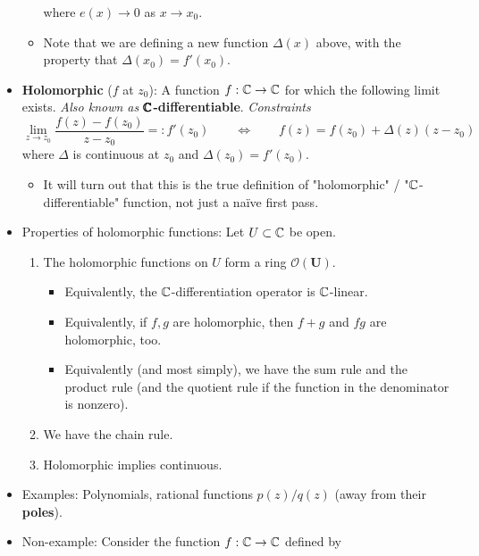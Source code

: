 \documentclass[../notes.tex]{subfiles}
\begin{document}
\begin{itemize}
\begin{itemize}
\begin{equation*}
        \end{equation*}
        where $e(x)\to 0$ as $x\to x_0$.
        \item Note that we are defining a new function $\Delta(x)$ above, with the property that $\Delta(x_0)=f'(x_0)$.
    \end{itemize}
    \pagebreak
    \item \textbf{Holomorphic} ($f$ at $z_0$): A function $f:\mathbb{C}\to\mathbb{C}$ for which the following limit exists. \emph{Also known as} \textbf{$\pmb{\mathbb{C}}$-differentiable}. \emph{Constraints}
    \begin{equation*}
        \lim_{z\to z_0}\frac{f(z)-f(z_0)}{z-z_0} =: f'(z_0)
        \qquad\Longleftrightarrow\qquad
        f(z) = f(z_0)+\Delta(z)(z-z_0)
    \end{equation*}
    where $\Delta$ is continuous at $z_0$ and $\Delta(z_0)=f'(z_0)$.
    \begin{itemize}
        \item It will turn out that this is the true definition of "holomorphic" / "$\mathbb{C}$-differentiable" function, not just a na\"{i}ve first pass.
    \end{itemize}
    \item Properties of holomorphic functions: Let $U\subset\mathbb{C}$ be open.
    \begin{enumerate}
        \item The holomorphic functions on $U$ form a ring $\bm{\mathcal{O}(U)}$.
        \begin{itemize}
            \item Equivalently, the $\mathbb{C}$-differentiation operator is $\mathbb{C}$-linear.
            \item Equivalently, if $f,g$ are holomorphic, then $f+g$ and $fg$ are holomorphic, too.
            \item Equivalently (and most simply), we have the sum rule and the product rule (and the quotient rule if the function in the denominator is nonzero).
        \end{itemize}
        \item We have the chain rule.
        \item Holomorphic implies continuous.
    \end{enumerate}
    \item Examples: Polynomials, rational functions $p(z)/q(z)$ (away from their \textbf{poles}).
    \item Non-example: Consider the function $f:\mathbb{C}\to\mathbb{C}$ defined by
    \begin{equation*}

\end{equation*}
\end{itemize}
\end{document}
